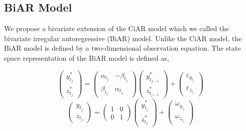 \subsection{BiAR Model}\label{biar-model}

We propose a bivariate extension of the CiAR model which we called the bivariate irregular autoregressive (BiAR) \citep{Elorrieta_2021} model. Unlike the CiAR model, the BiAR model is defined by a two-dimensional observation equation. The state space representation of the BiAR model is defined as,

\begin{equation}
\left(\begin{array}{c} y_{t_j}^{*} \\  z_{t_j}^{*} \end{array} \right)= \left(\begin{array}{cc} \alpha_{t_j}  & -\beta_{t_j} \\ \beta_{t_j} & \alpha_{t_j} \end{array} \right)\left(\begin{array}{c} y_{t_{j-1}}^{*} \\  z_{t_{j-1}}^{*} \end{array} \right) + \left(\begin{array}{c} \varepsilon_{y_{t_j}} \\ \varepsilon_{z_{t_j}} \end{array} \right)
\label{eq:BIARSS}
\end{equation}
\begin{equation}
\left(\begin{array}{c} y_{t_j} \\  z_{t_j} \end{array} \right)  = \left(\begin{array}{cc} 1 & 0 \\ 0 & 1 \end{array} \right) \left(\begin{array}{c} y_{t_j}^{*}  \\  z_{t_j}^{*}  \end{array} \right) +  \left(\begin{array}{c} \omega_{y_{t_j}} \\ \omega_{z_{t_j}} \end{array} \right)
\label{eq:BIARSS2}
\end{equation}


